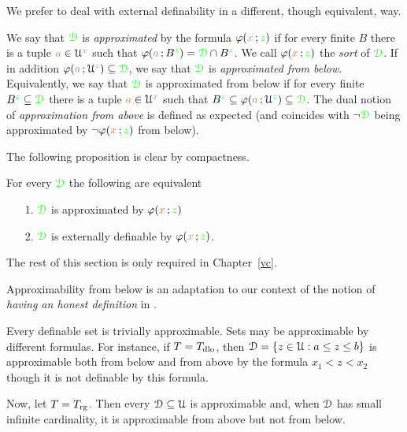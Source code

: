 \noindent\llap{\textcolor{red}{\Large\warning}\kern1.5ex}%
We prefer to deal with external definability in a different, though equivalent, way.

\begin{definition}\label{def_approx}
We say that ${\color{green}\EuScript D}$ is \emph{approximated\/} by the formula $\varphi({\color{brown} x}\,;{\color{green} z})$ if for every finite $B$ there is a tuple ${\color{brown} a}\in\EuScript U^{\color{brown} x}$ such that $\varphi({\color{brown} a}\,;B^{\color{green} z})={\color{green}\EuScript D}\cap B^{\color{green} z}$.
We call $\varphi({\color{brown} x}\,;{\color{green} z})$ the \emph{sort} of ${\color{green}\EuScript D}$.
If in addition $\varphi({\color{brown} a}\,;\EuScript U^{\color{green} z})\subseteq{\color{green}\EuScript D}$, we say that  ${\color{green}\EuScript D}$ is \emph{approximated from below}.
Equivalently, we say that  ${\color{green}\EuScript D}$ is approximated from below if for every finite $B^{\color{green} z}\subseteq{\color{green}\EuScript D}$ there is a tuple ${\color{brown} a}\in\EuScript U^{\color{brown} x}$ such that  $B^{\color{green} z}\subseteq\varphi({\color{brown} a}\,;\EuScript U^{\color{green} z})\subseteq{\color{green}\EuScript D}$.
The dual notion of \emph{approximation from above\/} is defined as expected (and coincides with $\neg{\color{green}\EuScript D}$ being approximated by $\neg\varphi({\color{brown} x}\,;{\color{green} z})$ from below).
\end{definition} 

The following proposition is clear by compactness.

\begin{proposition}\label{prop_approx=external}
   For every ${\color{green}\EuScript D}$ the following are equivalent
   \begin{itemize}
   \item[1.] ${\color{green}\EuScript D}$ is approximated by $\varphi({\color{brown} x}\,;{\color{green} z})$
   \item[2.] ${\color{green}\EuScript D}$ is externally definable by $\varphi({\color{brown} x}\,;{\color{green} z})$.
   \end{itemize}
\end{proposition}

The rest of this section is only required in Chapter~\ref{vc}.

Approximability from below is an adaptation to our context of the notion of \textit{having an honest definition} in \cite{CS}.

\begin{example}
Every definable set is trivially approximable.
Sets may be approximable by different formulas.
For instance, if $T=T_{\rm dlo}$, then $\EuScript D=\{z\in\EuScript U:a\le z\le b\}$ is approximable both from below and from above by the formula $x_1<z<x_2$ though it is not definable by this formula.

Now, let $T=T_{\rm rg}$.
Then every $\EuScript D\subseteq\EuScript U$ is approximable and, when $\EuScript D$ has small infinite cardinality, it is approximable from above but not from below.
\end{example}

